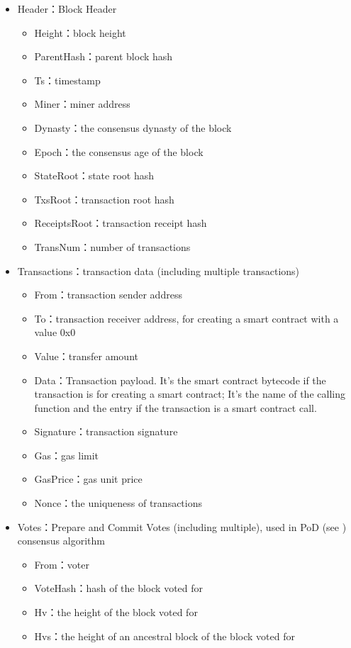 \begin{itemize}
	\item Header：Block Header
		\begin{itemize}
		\item Height：block height
		\item ParentHash：parent block hash
		\item Ts：timestamp
		\item Miner：miner address
		\item Dynasty：the consensus dynasty of the block
		\item Epoch：the consensus age of the block
		\item StateRoot：state root hash
		\item TxsRoot：transaction root hash
		\item ReceiptsRoot：transaction receipt hash
		\item TransNum：number of transactions
		\end{itemize}
	\item Transactions：transaction data (including multiple transactions)
		\begin{itemize}
		\item From：transaction sender address
		\item To：transaction receiver address, for creating a smart contract with a value 0x0
		\item Value：transfer amount
		\item Data：Transaction payload. It's the smart contract bytecode if the transaction is for creating a smart contract; It's the name of the calling function and the entry if the transaction is a smart contract call.
		\item Signature：transaction signature
		\item Gas：gas limit
		\item GasPrice：gas unit price
		\item Nonce：the uniqueness of transactions
		\end{itemize}
	\item Votes：Prepare and Commit Votes (including multiple), used in PoD (see ) consensus algorithm
		\begin{itemize}
		\item From：voter
		\item VoteHash：hash of the block voted for
		\item Hv：the height of the block voted for
		\item Hvs：the height of an ancestral block of the block voted for

\end{itemize}
\end{itemize}
